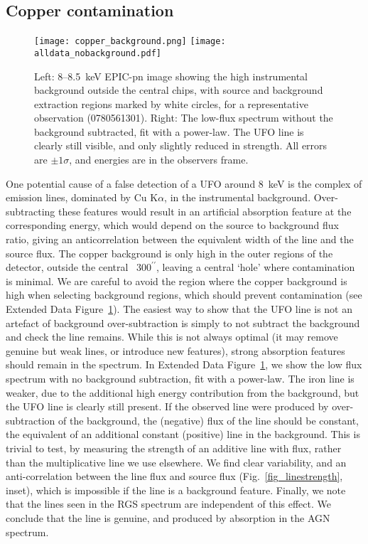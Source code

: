 \documentclass[10pt, a4paper]{article}
\begin{document}
\subsection*{Copper contamination}

\begin{figure}[h]
\centering
\texttt{[image: copper\_background.png]}
\texttt{[image: alldata\_nobackground.pdf]}
\caption{Left: 8--8.5~keV EPIC-pn image showing the high instrumental background outside the central chips, with source and background extraction regions marked by white circles, for a representative observation (0780561301). Right: The low-flux spectrum without the background subtracted, fit with a power-law. The UFO line is clearly still visible, and only slightly reduced in strength. All errors are $\pm1\sigma$, and energies are in the observers frame.}
\label{fig_background_map}
\end{figure}


One potential cause of a false detection of a UFO around 8~keV is the complex of emission lines, dominated by Cu K$\alpha$, in the instrumental background\cite{Freyberg04}. Over-subtracting these features would result in an artificial absorption feature at the corresponding energy, which would depend on the source to background flux ratio, giving an anticorrelation between the equivalent width of the line and the source flux. The copper background is only high in the outer regions of the detector, outside the central ~$300^{\prime\prime}$, leaving a central `hole' where contamination is minimal.
We are careful to avoid the region where the copper background is high when selecting background regions, which should prevent contamination (see Extended Data Figure~\ref{fig_background_map}). 
The easiest way to show that the UFO line is not an artefact of background over-subtraction is simply to not subtract the background and check the line remains. While this is not always optimal (it may remove genuine but weak lines, or introduce new features), strong absorption features should remain in the spectrum. In Extended Data Figure~\ref{fig_background_map}, we show the low flux spectrum with no background subtraction, fit with a power-law. The iron line is weaker, due to the additional high energy contribution from the background, but the UFO line is clearly still present.
If the observed line were produced by over-subtraction of the background, the (negative) flux of the line should be constant, the equivalent of an additional constant (positive) line in the background. This is trivial to test, by measuring the strength of an additive line with flux, rather than the multiplicative line we use elsewhere. We find clear variability, and an anti-correlation between the line flux and source flux (Fig.~\ref{fig_linestrength}, inset), which is impossible if the line is a background feature. 
Finally, we note that the lines seen in the RGS spectrum are independent of this effect. We conclude that the line is genuine, and produced by absorption in the AGN spectrum.
\end{document}
